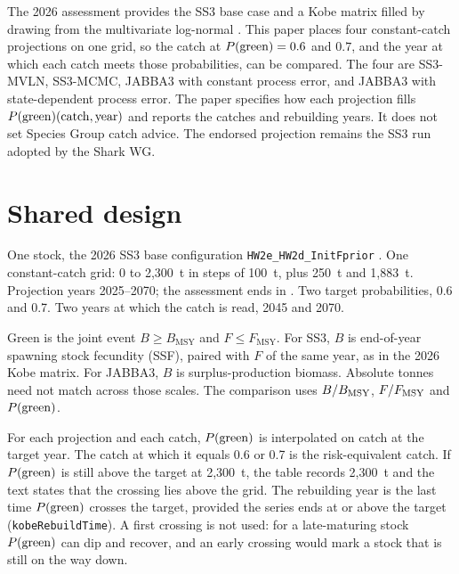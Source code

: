 \documentclass[11pt,a4paper]{article}
\begin{document}
The 2026 assessment provides the SS3 base case and a Kobe matrix filled by
drawing from the multivariate log-normal \citep{Liniers2026}. This paper
places four constant-catch projections on one grid, so the catch at
$P(\mathrm{green}) = 0.6$ and $0.7$, and the year at which each catch meets those
probabilities, can be compared. The four are SS3-MVLN, SS3-MCMC, JABBA3
with constant process error, and JABBA3 with state-dependent process error.
The paper specifies how each projection fills
$P(\mathrm{green})(\mathrm{catch}, \mathrm{year})$ and reports the catches and rebuilding
years. It does not set Species Group catch advice. The endorsed projection
remains the SS3 run adopted by the Shark WG.

\section{Shared design}

One stock, the 2026 SS3 base configuration
\texttt{HW2e\_HW2d\_InitFprior} \citep{Liniers2026}. One constant-catch grid:
0 to 2{,}300~t in steps of 100~t, plus 250~t and 1{,}883~t. Projection years
2025--2070; the assessment ends in \histEnd. Two target probabilities, 0.6
and 0.7. Two years at which the catch is read, 2045 and 2070.

Green is the joint event $B \ge B_{\mathrm{MSY}}$ and
$F \le F_{\mathrm{MSY}}$. For SS3, $B$ is end-of-year spawning stock fecundity
(SSF), paired with $F$ of the same year, as in the 2026 Kobe matrix. For
JABBA3, $B$ is surplus-production biomass. Absolute tonnes need not match
across those scales. The comparison uses $B/B_{\mathrm{MSY}}$, $F/F_{\mathrm{MSY}}$ and $P(\mathrm{green})$.

For each projection and each catch, $P(\mathrm{green})$ is interpolated on catch at the
target year. The catch at which it equals 0.6 or 0.7 is the risk-equivalent
catch. If $P(\mathrm{green})$ is still above the target at 2{,}300~t, the table records
2{,}300~t and the text states that the crossing lies above the grid. The
rebuilding year is the last time $P(\mathrm{green})$ crosses the target, provided the
series ends at or above the target (\texttt{kobeRebuildTime}). A first
crossing is not used: for a late-maturing stock $P(\mathrm{green})$ can dip and recover,
and an early crossing would mark a stock that is still on the way down.
\end{document}
